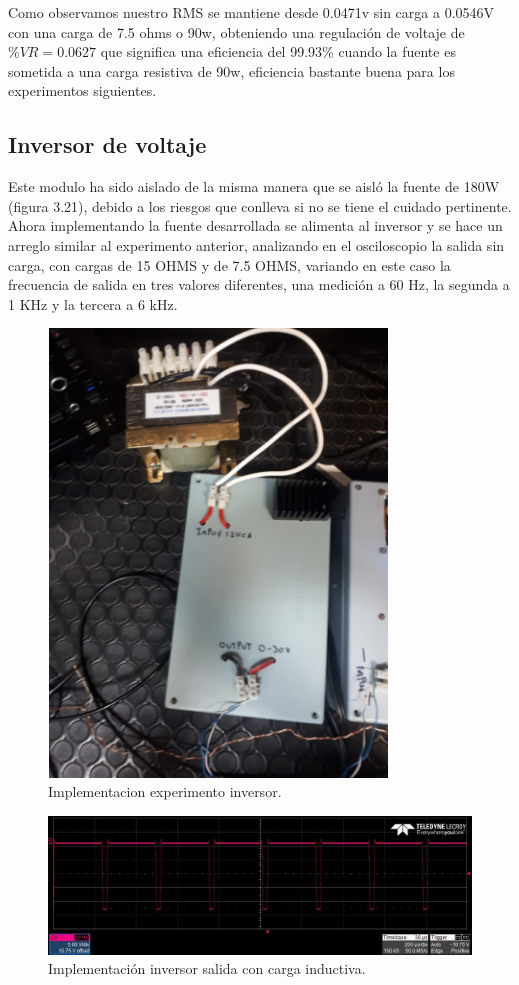 Como observamos nuestro RMS se mantiene desde 0.0471v sin carga a 0.0546V con una carga de 7.5 ohms o 90w, obteniendo una regulación de voltaje de $\%VR=0.0627$ que significa una eficiencia del 99.93\% cuando la fuente es sometida a una carga resistiva de 90w, eficiencia bastante buena para los experimentos siguientes. 

\subsection{Inversor de voltaje}

Este modulo ha sido aislado de la misma manera que se aisló la fuente de 180W (figura 3.21), debido a los riesgos que conlleva si no se tiene el cuidado pertinente. Ahora implementando la fuente desarrollada se alimenta al inversor y se hace un arreglo similar al experimento anterior, analizando en el osciloscopio la salida sin carga, con cargas de 15 OHMS y de 7.5 OHMS, variando en este caso la frecuencia de salida en tres valores diferentes, una medición a 60 Hz, la segunda a 1 KHz y la tercera a 6 kHz.



\begin{figure}[H]
\centering
\includegraphics[width=9cm]{Capitulo3/figs/fotofuente.png}
\caption{Implementacion experimento inversor.}
\end{figure}

\begin{figure}[H]
\centering
\includegraphics[width=12cm]{Capitulo3/figs/pwm1.jpg}
\caption{Implementación inversor salida con carga inductiva.}
\end{figure}



